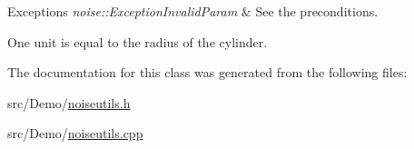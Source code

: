 \begin{DoxyExceptions}{Exceptions}
{\em noise\+::\+Exception\+Invalid\+Param} & See the preconditions.\\
\hline
\end{DoxyExceptions}
One unit is equal to the radius of the cylinder. 

The documentation for this class was generated from the following files\+:\begin{DoxyCompactItemize}
\item 
src/\+Demo/\hyperlink{_demo_2noiseutils_8h}{noiseutils.\+h}\item 
src/\+Demo/\hyperlink{_demo_2noiseutils_8cpp}{noiseutils.\+cpp}\end{DoxyCompactItemize}
